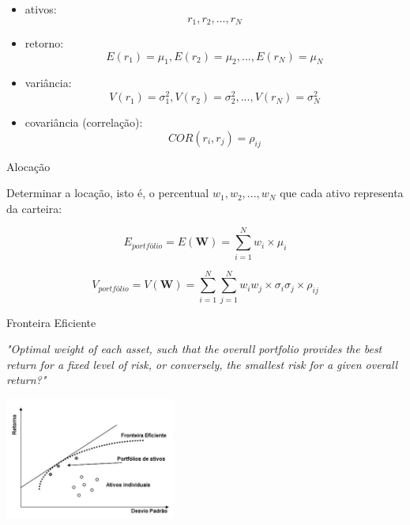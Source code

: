 \documentclass{beamer}
\begin{document}
\begin{frame}{\cite{mkv}}

\begin{itemize}
\item ativos: $$r_1,r_2,...,r_N$$
\item retorno: $$E(r_1)=\mu_1,E(r_2)=\mu_2,...,E(r_N)=\mu_N$$
\item variância: $$V(r_1)=\sigma^2_1,V(r_2)=\sigma^2_2,...,V(r_N)=\sigma^2_N$$
\item covariância (correlação): $$COR(r_i,r_j) = \rho_{ij}$$
\end{itemize}


\end{frame}

\begin{frame}{Alocação}

Determinar a locação, isto é, o percentual $w_1,w_2,...,w_N$ que cada ativo representa da carteira:

  
\begin{equation}
E_{portfólio} = E(\mathbf{ W})=  \sum_{i=1}^N w_i \times \mu_i
\end{equation}


\begin{equation}
V_{portfólio} =V(\mathbf{ W})= \sum_{i=1}^N\sum_{j=1}^N w_i w_j \times \sigma_i \sigma_j \times  \rho_{ij}
\end{equation}

\end{frame}




\begin{frame}{Fronteira Eficiente}


\textit{"Optimal weight of each asset, such that the overall portfolio provides the best return for a fixed level of risk, or conversely, the smallest risk for a given overall
return?"} \cite{Laloux1999}



\begin{center}
 \includegraphics[height=4cm,keepaspectratio]{marko_02.png}
 \end{center}
 
\end{frame}
\end{document}
